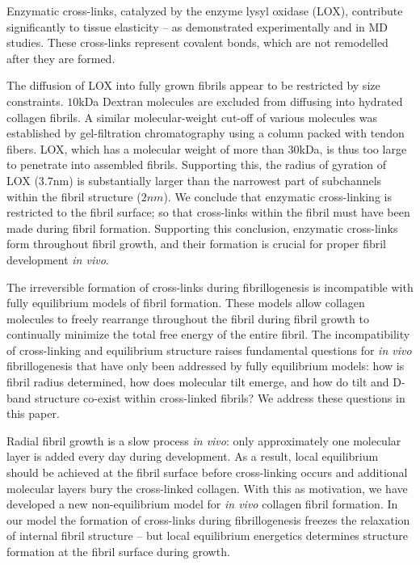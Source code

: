 \documentclass[twoside,twocolumn,9pt]{article}
\begin{document}
Enzymatic cross-links, catalyzed by the enzyme lysyl oxidase (LOX), \cite{Kagan:1991} contribute significantly to tissue elasticity \cite{Eekhoff:2018} -- as demonstrated  experimentally \cite{Makris:2014} and in MD studies.\cite{Depalle:2015}  These cross-links represent covalent bonds, which are not remodelled after they are formed.

The diffusion of LOX into fully grown fibrils appear to be restricted by size constraints. $10$kDa Dextran molecules are excluded from diffusing into hydrated collagen fibrils.\cite{EkaniNkodo:2003} A similar molecular-weight cut-off of various molecules was established by gel-filtration chromatography using a column packed with tendon fibers.\cite{Toroian:2007} LOX, which has a molecular weight of more than $30$kDa,\cite{Kagan:1991} is thus too large to penetrate into assembled fibrils. Supporting this, the radius of gyration of LOX ($3.7$nm)\cite{Vallet:2018} is substantially larger than the narrowest part of subchannels within the fibril structure ($2nm$)\cite{Xu:2018, Xu:2020}. We conclude that enzymatic cross-linking is restricted to the fibril surface; so that cross-links within the fibril must have been made during fibril formation. Supporting this conclusion, enzymatic cross-links  form throughout  fibril growth,\cite{Marturano:2014} and their formation is crucial for proper fibril development \emph{in vivo}.\cite{Herchenhan:2015}

The irreversible formation of cross-links during fibrillogenesis is incompatible with fully equilibrium models of fibril formation. These models allow collagen molecules to freely rearrange throughout the fibril during fibril growth to continually minimize the total free energy of the entire fibril.\cite{Brown:2014, Cameron:2018, Cameron:2020} The incompatibility of cross-linking and equilibrium structure raises fundamental questions for \textit{in vivo} fibrillogenesis that have only been addressed by fully equilibrium models: how is fibril radius determined, how does molecular tilt emerge, and how do tilt and D-band structure co-exist within cross-linked fibrils? We address these questions in this paper. 

Radial fibril growth is a slow process \emph{in vivo}: only approximately one molecular layer is added every day during development.\cite{Kalson:2015, Hulmes:1995} As a result, local equilibrium should be achieved at the fibril surface before cross-linking occurs and additional molecular layers bury the cross-linked collagen. With this as motivation, we have developed a new non-equilibrium model for \textit{in vivo} collagen fibril formation. In our model the formation of cross-links during fibrillogenesis freezes the relaxation of internal fibril structure -- but local equilibrium energetics determines structure formation at the fibril surface during growth.
\end{document}
